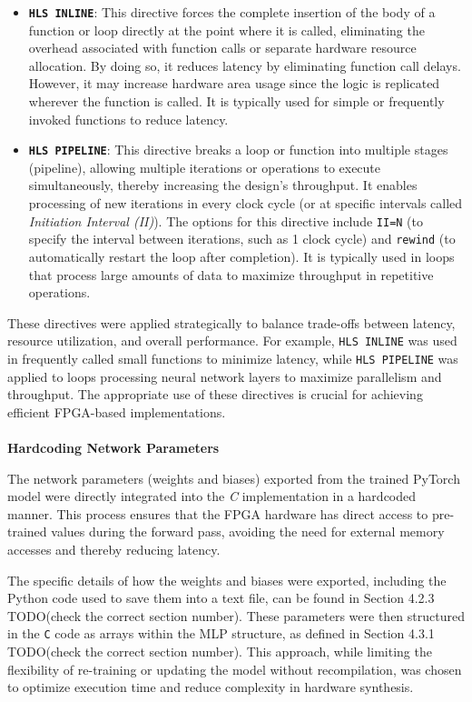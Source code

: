 \documentclass{article}
\begin{document}
\begin{itemize}
    \item \textbf{\texttt{HLS INLINE}}: This directive forces the complete insertion of the body of a function or loop directly at the point where it is called, eliminating the overhead associated with function calls or separate hardware resource allocation. By doing so, it reduces latency by eliminating function call delays. However, it may increase hardware area usage since the logic is replicated wherever the function is called. It is typically used for simple or frequently invoked functions to reduce latency.
    
    \item \textbf{\texttt{HLS PIPELINE}}: This directive breaks a loop or function into multiple stages (pipeline), allowing multiple iterations or operations to execute simultaneously, thereby increasing the design's throughput. It enables processing of new iterations in every clock cycle (or at specific intervals called \textit{Initiation Interval (II)}). The options for this directive include \texttt{II=N} (to specify the interval between iterations, such as 1 clock cycle) and \texttt{rewind} (to automatically restart the loop after completion). It is typically used in loops that process large amounts of data to maximize throughput in repetitive operations.
\end{itemize}

These directives were applied strategically to balance trade-offs between latency, resource utilization, and overall performance. For example, \texttt{HLS INLINE} was used in frequently called small functions to minimize latency, while \texttt{HLS PIPELINE} was applied to loops processing neural network layers to maximize parallelism and throughput. The appropriate use of these directives is crucial for achieving efficient FPGA-based implementations.\\\\
\textbf{Hardcoding Network Parameters}

The network parameters (weights and biases) exported from the trained PyTorch model were directly integrated into the \textit{C} implementation in a hardcoded manner. This process ensures that the FPGA hardware has direct access to pre-trained values during the forward pass, avoiding the need for external memory accesses and thereby reducing latency.

The specific details of how the weights and biases were exported, including the Python code used to save them into a text file, can be found in Section 4.2.3 TODO(check the correct section number). These parameters were then structured in the \texttt{C} code as arrays within the MLP structure, as defined in Section 4.3.1 TODO(check the correct section number). This approach, while limiting the flexibility of re-training or updating the model without recompilation, was chosen to optimize execution time and reduce complexity in hardware synthesis.
\end{document}
